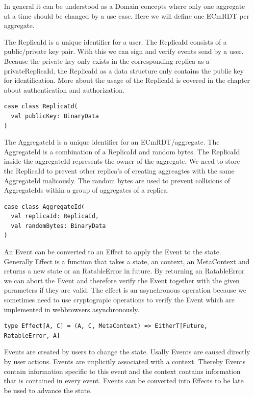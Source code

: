 \documentclass[
	ngerman,
	ruledheaders=section,   %
	class=report,		    %
	thesis={type=bachelor}, %
	accentcolor=9c,			%
	custommargins=true,    %
	marginpar=false,        %
	parskip=half-,          %
	fontsize=11pt,          %
]{tudapub}
\begin{document}
In general it can be understood as a Domain concepts where only one aggregate at a time should be changed by a use case. Here we will define one ECmRDT per aggregate. 

The ReplicaId is a unique identifier for a user. The ReplicaId consists of a public/private key pair. With this we can sign and verify events send by a user. Because the private key only exists in the corresponding replica as a privateReplicaId, the ReplicaId as a data structure only contains the public key for identification. More about the usage of the ReplicaId is covered in the chapter about authentication and authorization. 

\begin{lstlisting}
case class ReplicaId(
  val publicKey: BinaryData
)
\end{lstlisting}

The AggregateId is a unique identifier for an ECmRDT/aggregate. The AggregateId is a combination of a ReplicaId and random bytes. The ReplicaId inside the aggregateId represents the owner of the aggregate. We need to store the ReplicaId to prevent other replica's of creating aggreagtes with the same AggregateId malicously. The random bytes are used to prevent collisions of AggregateIds within a group of aggregates of a replica. 

\begin{lstlisting}
case class AggregateId(
  val replicaId: ReplicaId,
  val randomBytes: BinaryData
)
\end{lstlisting}

An Event can be converted to an Effect to apply the Event to the state. Generally Effect is a function that takes a state, an context, an MetaContext and returns a new state or an RatableError in future. By returning an RatableError we can abort the Event and therefore verify the Event together with the given parameters if they are valid. The effect is an asynchronous operation because we sometimes need to use cryptograpic operations to verify the Event which are implemented in webbrowsers asynchronously.

\begin{lstlisting}
type Effect[A, C] = (A, C, MetaContext) => EitherT[Future, RatableError, A]
\end{lstlisting}

Events are created by users to change the state. Usally Events are caused directly by user actions. Events are implicitly associated with a context. Thereby Events contain information specific to this event and the context contains information that is contained in every event. Events can be converted into Effects to be late be used to advance the state.
\end{document}
